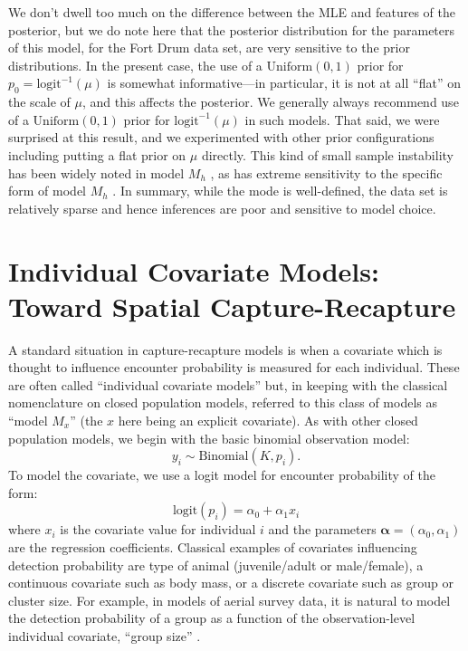 We don't dwell too much on the difference between the MLE and features
of the posterior, 
 but we do note here that
the posterior distribution for the parameters of this model, for the
Fort Drum data set, are very sensitive to the prior
distributions. 
In the present case, the use of a $\mbox{Uniform}(0,1)$
prior for $p_{0} = \mbox{logit}^{-1}(\mu)$ is somewhat
informative---in particular, it is not at all ``flat'' on the scale of
$\mu$, and this affects the posterior.  We generally always recommend
use of a $\mbox{Uniform}(0,1)$ prior for $\mbox{logit}^{-1}(\mu)$ in
such models. That said, we were surprised at this result, and we
experimented with other prior configurations including putting a flat
prior on $\mu$ directly. 
This kind of small sample instability has been widely
noted in model $M_h$ \citep{fienberg_etal:1999, dorazio_royle:2003},
as has extreme sensitivity to the specific form of model $M_{h}$
\citep{link:2003}.  In summary, while the mode is well-defined, the
data set is relatively sparse and hence inferences are poor and
sensitive to model choice.









\section{Individual Covariate Models: Toward Spatial Capture-Recapture}
\label{closed.sec.indcov}


A standard situation in capture-recapture models is when a covariate
which is thought to influence encounter probability is measured for
each individual. These are often called ``individual covariate
models'' but, in keeping with 
the classical nomenclature on closed
population models, \citet{kery_schaub:2011} 
referred to this class of models as ``model $M_{x}$'' (the $x$ here
being an explicit covariate).
 As with other closed population models, we begin
with the basic binomial observation model:
\[
y_{i} \sim \mbox{Binomial}(K, p_{i}).
\]
To model the covariate, we use a logit model for encounter probability
of the form:
\begin{equation}
 \mbox{logit}(p_{i}) = \alpha_0 + \alpha_1 x_{i}
\label{closed.eq.ha}
\end{equation}
where $x_i$ is the covariate value for individual $i$ and the
parameters $\bm{\alpha}= (\alpha_0, \alpha_1)$ are the regression coefficients. Classical
examples of covariates influencing detection probability are type of
animal (juvenile/adult or male/female), a continuous covariate such as
body mass,  or a discrete covariate
such as group or cluster size. For example, in models of aerial survey
data, it is natural to model the detection probability of a group as a
function of the observation-level individual covariate, ``group size''
\citep{royle:2008, langtimm_etal:2011}.

